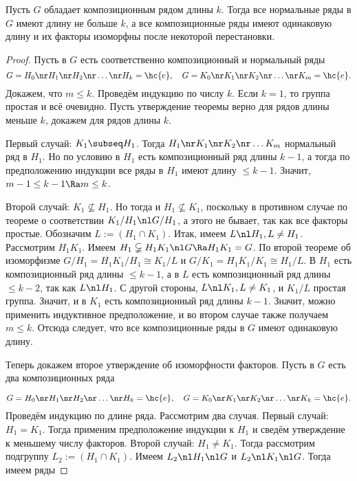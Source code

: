 \documentclass[a4paper]{article}
\begin{document}
\begin{theorem}
Пусть $G$ обладает композиционным рядом длины $k$. Тогда все нормальные ряды в $G$ имеют длину не  больше
$k$, а все композиционные ряды имеют одинаковую длину и их факторы изоморфны после некоторой перестановки.
\end{theorem}
\begin{proof}
Пусть в $G$ есть соответственно композиционный и нормальный ряды
$$G = H_0 \nr H_1 \nr H_2 \nr \ldots \nr H_k = \hc{e}, \quad G = K_0 \nr K_1 \nr K_2 \nr \ldots \nr K_m = \hc{e}.$$
Докажем, что $m \le k$. Проведём индукцию по числу $k$. Если $k=1$, то группа простая и всё очевидно.  Пусть
утверждение теоремы верно для рядов длины меньше $k$, докажем для рядов длины $k$.

 Первый случай: $K_1 \subseq H_1$. Тогда $H_1 \nr K_1 \nr K_2 \nr \ldots K_m$ нормальный ряд  в
$H_1$. Но по условию в $H_1$ есть композиционный ряд длины $k-1$, а тогда по предположению индукции все ряды
в $H_1$ имеют длину $\le k-1$. Значит, $m-1 \le k-1 \Ra m \le k$.

 Второй случай: $K_1 \nsubseteq H_1$. Но тогда и $H_1 \nsubseteq K_1$, поскольку в противном случае  по
теореме о соответствии $K_1/H_1 \nl G/H_1$, а этого не бывает, так как все факторы простые. Обозначим $L :=
(H_1 \cap K_1)$. Итак, имеем $L \nl H_1, L \neq H_1$. Рассмотрим $H_1 K_1$. Имеем $H_1 \varsubsetneqq H_1 K_1
\nl G \Ra H_1K_1 = G$. По второй теореме об изоморфизме $G/H_1 = H_1 K_1/H_1 \cong K_1/L$ и $G/K_1 =
H_1K_1/K_1 \cong H_1/L$. В $H_1$ есть композиционный ряд длины $\le k-1$, а в $L$ есть композиционный ряд
длины $\le k-2$, так как $L \nl H_1$. С другой стороны, $L \nl K_1, L \neq K_1$, и $K_1/L$ простая
группа. Значит, и в $K_1$ есть композиционный ряд длины $k-1$. Значит, можно применить индуктивное
предположение, и во втором случае также получаем $m \le k$. Отсюда следует, что все композиционные ряды в $G$
имеют одинаковую длину.

Теперь докажем второе утверждение об изоморфности факторов. Пусть в $G$ есть два композиционных ряда

$$G = H_0 \nr H_1 \nr H_2 \nr \ldots \nr H_k = \hc{e}, \quad G = K_0 \nr K_1 \nr K_2 \nr \ldots \nr K_k = \hc{e}.$$
Проведём индукцию по длине ряда. Рассмотрим два случая. Первый случай: $H_1=K_1$. Тогда применим
предположение индукции к $H_1$ и сведём утверждение к меньшему числу факторов. Второй случай: $H_1 \neq K_1$.
Тогда рассмотрим подгруппу $L_2 := (H_1 \cap K_1)$. Имеем $L_2 \nl H_1 \nl G$ и $L_2 \nl K_1 \nl G$. Тогда
имеем ряды


\end{proof}
\end{document}
